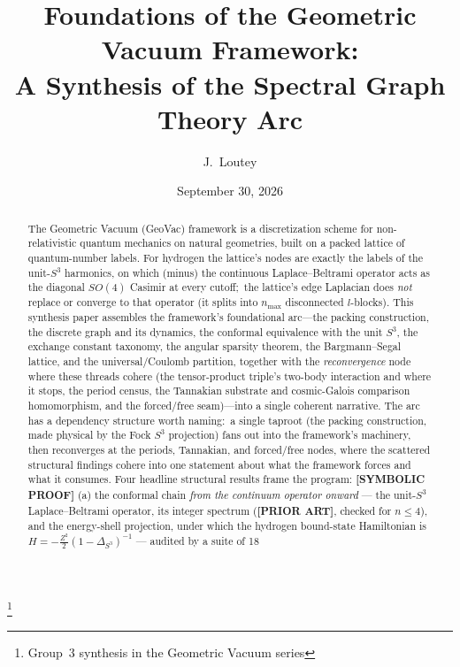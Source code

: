 \documentclass[aps,pra,twocolumn,superscriptaddress,longbibliography]{revtex4-2}
\newcommand{\gvc}[2]{#2}
\begin{document}
\title{Foundations of the Geometric Vacuum Framework:\\
A Synthesis of the Spectral Graph Theory Arc}
\thanks{Group~3 synthesis in the Geometric Vacuum series}

\author{J.~Loutey}

\date{September 30, 2026}


\begin{abstract}
The Geometric Vacuum (GeoVac) framework is a discretization scheme for
non-relativistic quantum mechanics on natural geometries, built on a
packed lattice of quantum-number labels.  For hydrogen the lattice's
nodes are exactly the labels of the unit-$S^3$ harmonics, on which
(minus) the continuous Laplace--Beltrami operator acts as the diagonal
$SO(4)$ Casimir at every cutoff;\ \gvc{graph-s3-wall}{the lattice's edge Laplacian does \emph{not}
replace or converge to that operator (it splits into $n_{\max}$
disconnected $l$-blocks)}.  This synthesis paper assembles the framework's foundational
arc---the packing construction, the discrete
graph and its dynamics, the conformal equivalence with the unit $S^3$,
the exchange constant taxonomy, the angular sparsity theorem, the
Bargmann--Segal lattice, and the universal/Coulomb partition, together
with the \emph{reconvergence} node where these threads cohere (the
tensor-product triple's two-body interaction and where it stops, the period
census, the Tannakian substrate and cosmic-Galois comparison homomorphism, and
the forced/free seam)---into a single coherent narrative.  The arc has a
dependency structure worth naming:\ a single taproot (the packing
construction, made physical by the Fock $S^3$ projection) fans out into
the framework's machinery, then reconverges at the periods, Tannakian,
and forced/free nodes, where the scattered structural findings cohere
into one statement about what the framework forces and what it consumes.  Four headline structural results frame the
program: \textbf{[SYMBOLIC PROOF]} (a) the conformal chain \emph{from the
continuum operator onward} --- the unit-$S^3$ Laplace--Beltrami operator, its
integer spectrum (\textbf{[PRIOR ART]}, checked for $n \le 4$), and the energy-shell projection, under which the hydrogen
bound-state Hamiltonian is $H = -\tfrac{Z^2}{2}(1-\Delta_{S^3})^{-1}$ --- audited by a suite of 18

\end{abstract}
\end{document}
